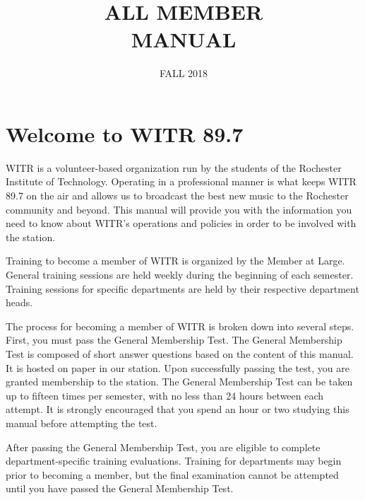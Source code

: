 \documentclass{witrman}
\date{FALL 2018}
\title{ALL MEMBER\\ MANUAL}
\begin{document}
\maketitle  %

\maketoc    %

\setpagebg

\mbox{}
\vspace{1cm}
\chapter{Welcome to WITR 89.7}

WITR is a volunteer-based organization run by the students of the Rochester
Institute of Technology.  Operating in a professional manner is what keeps WITR
89.7 on the air and allows us to broadcast the best new music to the Rochester
community and beyond.  This manual will provide you with the information you
need to know about WITR’s operations and policies in order to be involved with
the station.

Training to become a member of WITR is organized by the Member at Large.
General training sessions are held weekly during the beginning of each semester.
Training sessions for specific departments are held by their respective
department heads.

The process for becoming a member of WITR is broken down into several steps.
First, you must pass the General Membership Test.  The General Membership Test
is composed of short answer questions based on the content of this manual.  It
is hosted on paper in our station.  Upon successfully passing the test, you are
granted membership to the station.  The General Membership Test can be taken up
to fifteen times per semester, with no less than 24 hours between each attempt.
It is strongly encouraged that you spend an hour or two studying this manual
before attempting the test.

After passing the General Membership Test, you are eligible to complete
department-specific training evaluations.  Training for departments may begin
prior to becoming a member, but the final examination cannot be attempted until
you have passed the General Membership Test.

\pagebreak
\end{document}
